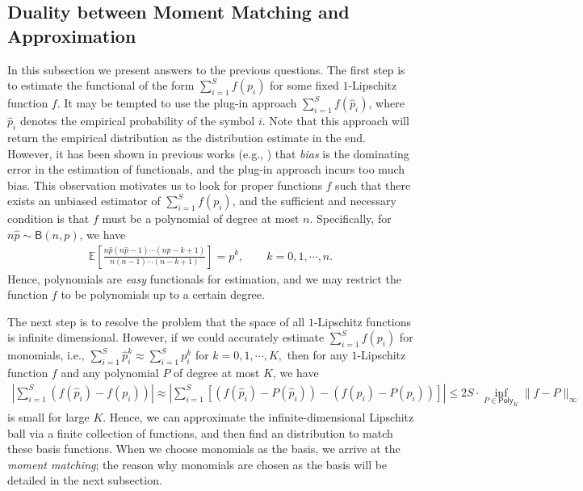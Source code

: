 \documentclass[final,12pt]{colt2018} %
\def \bE {\mathbb{E}}
\begin{document}
\subsection{Duality between Moment Matching and Approximation}
In this subsection we present answers to the previous questions. The first step is to estimate the functional of the form $\sum_{i=1}^S f(p_i)$ for some fixed $1$-Lipschitz function $f$. It may be tempted to use the plug-in approach $\sum_{i=1}^S f(\hat{p}_i)$, where $\hat{p}_i$ denotes the empirical probability of the symbol $i$. Note that this approach will return the empirical distribution as the distribution estimate in the end. However, it has been shown in previous works (e.g., \cite{Jiao--Venkat--Han--Weissman2015minimax}) that \emph{bias} is the dominating error in the estimation of functionals, and the plug-in approach incurs too much bias. This observation motivates us to look for proper functions $f$ such that there exists an unbiased estimator of $\sum_{i=1}^S f(p_i)$, and the sufficient and necessary condition is that $f$ must be a polynomial of degree at most $n$. Specifically, for $n\hat{p}\sim \mathsf{B}(n,p)$, we have
\begin{align*}
\bE\left[\frac{n\hat{p}(n\hat{p}-1)\cdots(n\hat{p}-k+1)}{n(n-1)\cdots(n-k+1)}\right] = p^k, \qquad k=0,1,\cdots,n.
\end{align*}
Hence, polynomials are \emph{easy} functionals for estimation, and we may restrict the function $f$ to be polynomials up to a certain degree.

The next step is to resolve the problem that the space of all $1$-Lipschitz functions is infinite dimensional. However, if we could accurately estimate $\sum_{i=1}^S f(p_i)$ for monomials, i.e.,
$
\sum_{i=1}^S \hat{p}_i^k \approx \sum_{i=1}^S p_i^k$ for $k=0,1,\cdots,K,
$
then for any $1$-Lipschitz function $f$ and any polynomial $P$ of degree at most $K$, we have
\begin{align*}
\left|\sum_{i=1}^S (f(\hat{p}_i) - f(p_i))\right| \approx \left|\sum_{i=1}^S [(f(\hat{p}_i) - P(\hat{p}_i)) - (f(p_i)-P(p_i))] \right| \le 2S\cdot \inf_{P\in \mathsf{Poly}_K} \|f-P\|_\infty
\end{align*}
is small for large $K$. Hence, we can approximate the infinite-dimensional Lipschitz ball via a finite collection of functions, and then find an distribution to match these basis functions. When we choose monomials as the basis, we arrive at the \emph{moment matching}; the reason why monomials are chosen as the basis will be detailed in the next subsection. 
\end{document}
